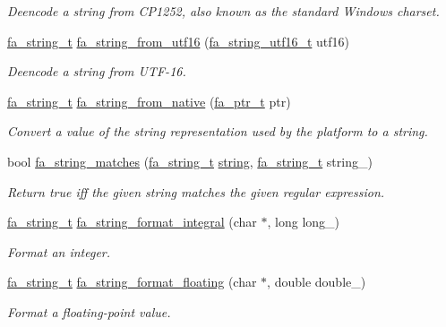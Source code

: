 \begin{DoxyCompactItemize}
\begin{DoxyCompactList}\small\item\em Deencode a string from C\-P1252, also known as the standard Windows charset. \end{DoxyCompactList}\item 
\hyperlink{group___fa_string_gacada63033b77bc6c39fa632ae199349b}{fa\-\_\-string\-\_\-t} \hyperlink{group___fa_string_ga782618271b1bfe2e85d8f4e3153783b7}{fa\-\_\-string\-\_\-from\-\_\-utf16} (\hyperlink{group___fa_string_ga8187bab75e77f0bbeeaf7ec2992cf7a9}{fa\-\_\-string\-\_\-utf16\-\_\-t} utf16)
\begin{DoxyCompactList}\small\item\em Deencode a string from U\-T\-F-\/16. \end{DoxyCompactList}\item 
\hyperlink{group___fa_string_gacada63033b77bc6c39fa632ae199349b}{fa\-\_\-string\-\_\-t} \hyperlink{group___fa_string_gad8b0ad9b3d2da3f7098587c81bf8cc0e}{fa\-\_\-string\-\_\-from\-\_\-native} (\hyperlink{group___fa_ga915ddeae99ad7568b273d2b876425197}{fa\-\_\-ptr\-\_\-t} ptr)
\begin{DoxyCompactList}\small\item\em Convert a value of the string representation used by the platform to a string. \end{DoxyCompactList}\item 
bool \hyperlink{group___fa_string_gaea2d11cbeae963c72444a7f038485487}{fa\-\_\-string\-\_\-matches} (\hyperlink{group___fa_string_gacada63033b77bc6c39fa632ae199349b}{fa\-\_\-string\-\_\-t} \hyperlink{util_8h_a41106000aac73b61e4fc2ef9dd39a603}{string}, \hyperlink{group___fa_string_gacada63033b77bc6c39fa632ae199349b}{fa\-\_\-string\-\_\-t} string\-\_\-)
\begin{DoxyCompactList}\small\item\em Return true iff the given string matches the given regular expression. \end{DoxyCompactList}\item 
\hyperlink{group___fa_string_gacada63033b77bc6c39fa632ae199349b}{fa\-\_\-string\-\_\-t} \hyperlink{group___fa_string_ga81a603fcf07f2313cb5cfd1816470d4b}{fa\-\_\-string\-\_\-format\-\_\-integral} (char $\ast$, long long\-\_\-)
\begin{DoxyCompactList}\small\item\em Format an integer. \end{DoxyCompactList}\item 
\hyperlink{group___fa_string_gacada63033b77bc6c39fa632ae199349b}{fa\-\_\-string\-\_\-t} \hyperlink{group___fa_string_ga2be20227e1b8dba9d0b154ce225156ac}{fa\-\_\-string\-\_\-format\-\_\-floating} (char $\ast$, double double\-\_\-)
\begin{DoxyCompactList}\small\item\em Format a floating-\/point value. \end{DoxyCompactList}\end{DoxyCompactItemize}


